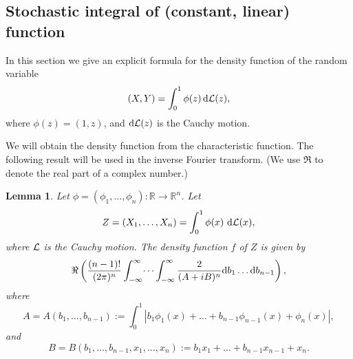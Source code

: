 \documentclass[11pt]{article}
\def\({\left(} \def\){\right)} \def\hatU{\widehat{U}}
\newtheorem{lem}[thm]{Lemma}
\def\BLEM{\begin{lem}}
\def\ELEM{\end{lem}}
\begin{document}
\subsection{Stochastic integral of (constant, linear) function }

In this section we give an explicit formula for the density
function of the random variable
$$(X,Y)=\int_0^1\phi(z)\,{\rm d}{\cal L}(z),$$
where $\phi(z)=(1,z)$, and ${\rm d}{\cal L}(z)$ is the Cauchy
motion.

We will obtain the density function from the characteristic
function. The following result will be used in the inverse Fourier
transform. (We use $\Re$ to denote the real part of a complex
number.)

\BLEM\label{leee}
Let $\phi=(\phi_1,\dots,\phi_n):{\mathbb
R}\rightarrow {\mathbb R}^n$. Let
\begin{equation*}
Z=(X_1,\dots,X_n)=\int_{0}^1 \phi(x)\,\,{\rm d}{\cal L}(x),
\end{equation*}
where ${\cal L}$ is the Cauchy motion. The density function $f$ of $Z$ is given by
\begin{equation}\label{eeeeq}
\Re\(\frac{(n-1)!}{(2\pi)^n}
\int_{-\infty}^\infty\dots\int_{-\infty}^\infty
\frac{2}{(A+iB)^n}
{\rm d}b_1 \dots {\rm d}b_{n-1}\),
\end{equation}
where
\begin{equation}\label{zzz}
A=A(b_1,\dots,b_{n-1}):=\int_0^1 \left| b_1\phi_1(x)+\dots+b_{n-1}\phi_{n-1}(x) + \phi_n(x) \right|,
\end{equation}
and
\begin{equation}\label{zzzb}
B=B(b_1,\dots,b_{n-1},x_1,\dots,x_n):=b_1x_1 + \dots + b_{n-1} x_{n-1} + x_n.
\end{equation}
\ELEM
\end{document}
